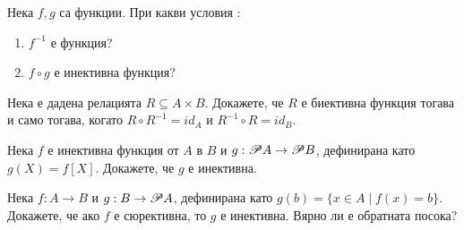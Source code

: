 \begin{problem}%
  Нека $f,g$ са функции. При какви условия :
  \begin{enumerate}
  \item
    $f^{-1}$ е функция?
  \item
    $f\circ g$ е инективна функция?
\end{enumerate}
\end{problem}



\begin{problem}
  Нека е дадена релацията $R\subseteq A\times B$.
  Докажете, че $R$ е биективна функция тогава и само тогава, когато $R\circ R^{-1} = id_A$ и $R^{-1}\circ R = id_B$.
\end{problem}

\begin{problem}
  Нека $f$ е инективна функция от $A$ в $B$ и $g:\mathscr{P} A \rightarrow \mathscr{P} B$, дефинирана като $g(X) = f[X]$.
  Докажете, че $g$ е инективна.
\end{problem}

\begin{problem}
  Нека $f:A\rightarrow B$ и $g:B\rightarrow\mathscr{P} A$, дефинирана като $g(b) = \{x\in A\mid f(x) = b\}$.
  Докажете, че ако $f$ е сюрективна, то $g$ е инективна.
  Вярно ли е обратната посока?
\end{problem}


